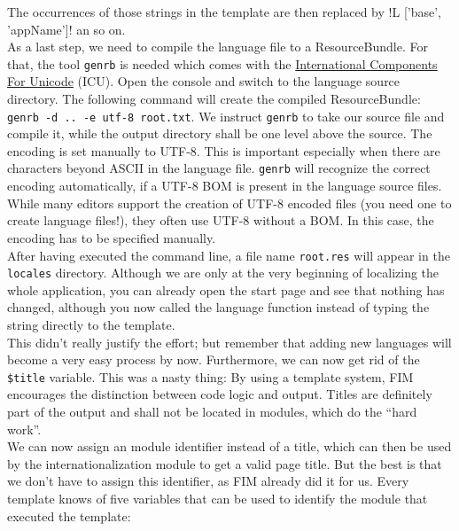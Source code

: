 \documentclass{scrartcl}
\begin{document}
      The occurrences of those strings in the template are then replaced by \smarty!{L ['base', 'appName']}! an so on. \\
      As a last step, we need to compile the language file to a ResourceBundle. For that, the tool \texttt{genrb} is needed which comes with the \href{http://site.icu-project.org/download}{\color{blue}International Components For Unicode} (ICU). Open the console and switch to the language source directory. The following command will create the compiled ResourceBundle:
      \texttt{genrb -d .. -e utf-8 root.txt}. We instruct \texttt{genrb} to take our source file and compile it, while the output directory shall be one level above the source. The encoding is set manually to UTF-8. This is important especially when there are characters beyond ASCII in the language file. \texttt{genrb} will recognize the correct encoding automatically, if a UTF-8 BOM is present in the language source files. While many editors support the creation of UTF-8 encoded files (you need one to create language files!), they often use UTF-8 without a BOM. In this case, the encoding has to be specified manually. \\
      After having executed the command line, a file name \texttt{root.res} will appear in the \texttt{locales} directory. Although we are only at the very beginning of localizing the whole application, you can already open the start page and see that nothing has changed, although you now called the language function instead of typing the string directly to the template. \\
      This didn't really justify the effort; but remember that adding new languages will become a very easy process by now. Furthermore, we can now get rid of the \lstinline!$title! variable. This was a nasty thing: By using a template system, FIM encourages the distinction between code logic and output. Titles are definitely part of the output and shall not be located in modules, which do the ``hard work''. \\
      We can now assign an module identifier instead of a title, which can then be used by the internationalization module to get a valid page title. But the best is that we don't have to assign this identifier, as FIM already did it for us. Every template knows of five variables that can be used to identify the module that executed the template:
\end{document}
